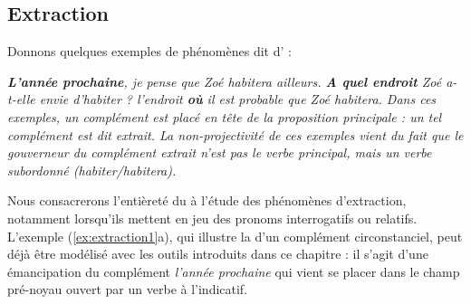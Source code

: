 \subsection{Extraction}
Donnons quelques exemples de phénomènes dit d' :

\ea\label{ex:extraction1}
\ea \itshape \textbf{L’année  prochaine},  je pense que Zoé habitera ailleurs.
\ex \itshape \textbf{A quel endroit}  Zoé a-t-elle envie d’habiter ?
\ex \itshape l’endroit \textbf{où}  il est probable que Zoé habitera.
\z
\z
Dans ces exemples, un complément est placé en tête de la proposition principale : un tel complément est dit extrait. La non-projectivité de ces exemples vient du fait que le gouverneur du complément extrait n'est pas le verbe principal, mais un verbe subordonné (\textit{habiter/habitera}).

Nous consacrerons l’entièreté du   à l’étude des phénomènes d'extraction, notamment lorsqu’ils mettent en jeu des pronoms interrogatifs ou relatifs. L'exemple (\ref{ex:extraction1}a), qui illustre la  d’un complément circonstanciel, peut déjà être modélisé avec les outils introduits dans ce chapitre : il s’agit d’une émancipation du complément \textit{l'année prochaine} qui vient se placer dans le champ pré-noyau ouvert par un verbe à l’indicatif. 

